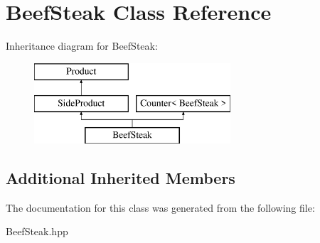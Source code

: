 \hypertarget{class_beef_steak}{}\section{Beef\+Steak Class Reference}
\label{class_beef_steak}
Inheritance diagram for Beef\+Steak\+:\begin{figure}[H]
\begin{center}
\leavevmode
\includegraphics[height=3.000000cm]{class_beef_steak}
\end{center}
\end{figure}
\subsection*{Additional Inherited Members}


The documentation for this class was generated from the following file\+:\begin{DoxyCompactItemize}
\item 
Beef\+Steak.\+hpp\end{DoxyCompactItemize}
